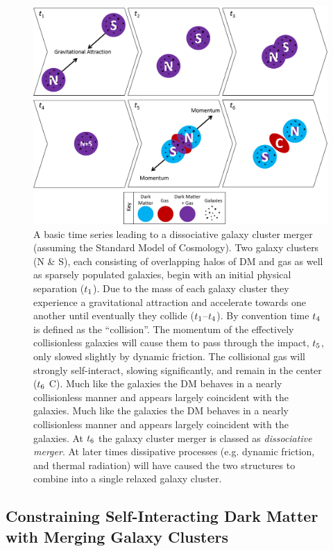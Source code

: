 \begin{figure}
\centering
\includegraphics[width=6in]{Chapter1/MergerTimeSeries.png}
\caption[A basic time series leading to a dissociative galaxy cluster merger.]{A basic time series leading to a dissociative galaxy cluster merger (assuming the Standard Model of Cosmology).
Two galaxy clusters (N \& S), each consisting of overlapping halos of DM and gas as well as sparsely populated galaxies, begin with an initial physical separation ($t_{\rm 1}$).
Due to the mass of each galaxy cluster they experience a gravitational attraction and accelerate towards one another until eventually they collide ($t_{\rm 1}$--$t_{\rm 4}$).
By convention time $t_{\rm 4}$ is defined as the ``collision''.
The momentum of the effectively collisionless galaxies will cause them to pass through the impact, $t_{\rm 5}$, only slowed slightly by dynamic friction. 
The collisional gas will strongly self-interact, slowing significantly, and remain in the center ($t_{\rm 6}$ C).
Much like the galaxies the DM behaves in a nearly collisionless manner and appears largely coincident with the galaxies.
Much like the galaxies the DM behaves in a nearly collisionless manner and appears largely coincident with the galaxies.
At $t_{\rm 6}$ the galaxy cluster merger is classed as \emph{dissociative merger}.
At later times dissipative processes (e.g. dynamic friction, and thermal radiation) will have caused the two structures to combine into a single relaxed galaxy cluster.
\label{fig:MergerTimeSeries}}
\end{figure}  

\subsection{Constraining Self-Interacting Dark Matter with Merging Galaxy Clusters}\label{section:DMconstraintWithMergers}

